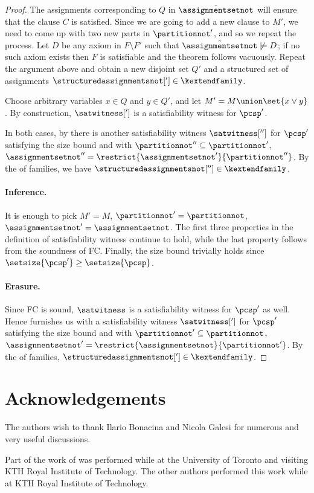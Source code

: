 \begin{proof}
The assignments corresponding to $Q$ in $\tilde{\assignmentsetnot}$ will ensure that the clause $C$ is satisfied. Since we are going to add a new clause to $M'$, we need to come up with two new parts in $\partitionnot'$, and so we repeat the process. Let $D$ be any axiom in $F\setminus F'$ such that $\tilde{\assignmentsetnot}\not\models D$; if no such axiom exists then $F$ is satisfiable and the theorem follows vacuously. Repeat the argument above and obtain a new disjoint set $Q'$ and a structured set of assignments $\structuredassignmentsnot['] \in \kextendfamily$.

Choose arbitrary variables $x \in Q$ and $y \in Q'$, and let $M'=M\union\set{x\lor y}$. By construction, $\satwitness[']$ is a satisfiability witness for $\pcsp'$.

In both cases, by  there is another satisfiability witness $\satwitness['']$ for $\pcsp'$ satisfying the size bound and with $\partitionnot''\subseteq\partitionnot'$, $\assignmentsetnot''=\restrict{\assignmentsetnot'}{\partitionnot''}$. By the \restrictionproperty of \kextendibleNok families, we have $\structuredassignmentsnot[''] \in \kextendfamily$.

%
\paragraph{Inference.} It is enough to pick $M'=M$, $\partitionnot'=\partitionnot$, $\assignmentsetnot'=\assignmentsetnot$. The first three properties in the definition of satisfiability witness continue to hold, while the last property follows from the soundness of FC\@. Finally, the size bound trivially holds since $\setsize{\pcsp'} \geq \setsize{\pcsp}$.

%
\paragraph{Erasure.} Since FC is sound, $\satwitness$ is a satisfiability witness for $\pcsp'$ as well. Hence  furnishes us with a satisfiability witness $\satwitness[']$ for $\pcsp'$ satisfying the size bound and with $\partitionnot'\subseteq\partitionnot$, $\assignmentsetnot'=\restrict{\assignmentsetnot}{\partitionnot'}$. By the \restrictionproperty of \kextendibleNok families, $\structuredassignmentsnot['] \in \kextendfamily$.
\end{proof}

\section*{Acknowledgements}

The authors wish to thank Ilario Bonacina and Nicola Galesi
for numerous and very useful discussions.

Part of the work of \theauthorYF was performed while at the University
of Toronto and visiting KTH Royal Institute of Technology.
%
The other authors performed this work while at KTH Royal Institute of
Technology.
 
